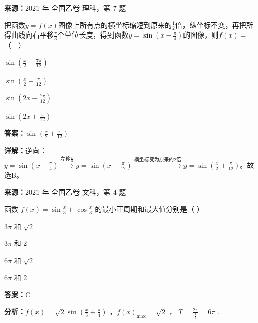 \begin{question}[points=5]
\textbf{来源：}2021 年 全国乙卷-理科，第 7 题\par
把函数$y=f(x)$图像上所有点的横坐标缩短到原来的$\frac12$倍，纵坐标不变，再把所得曲线向右平移$\frac{\pi}{3}$个单位长度，得到函数$y=\sin\left(x-\frac{\pi}{4}\right)$的图像，则$f(x)=$（  ）
\begin{choices}
  \item $\sin\left(\frac{x}{2}-\frac{7\pi}{12}\right)$
  \item $\sin\left(\frac{x}{2}+\frac{\pi}{12}\right)$
  \item $\sin\left(2x-\frac{7\pi}{12}\right)$
  \item $\sin\left(2x+\frac{\pi}{12}\right)$
\end{choices}
\begin{solution}
\textbf{答案：}$\sin\left(\frac{x}{2}+\frac{\pi}{12}\right)$

\textbf{详解：}逆向：$y=\sin\left(x-\frac{\pi}{4}\right) \xrightarrow{\text{左移}\frac{\pi}{3}} y=\sin\left(x+\frac{\pi}{12}\right) \xrightarrow{\text{横坐标变为原来的2倍}} y=\sin\left(\frac{x}{2}+\frac{\pi}{12}\right)$。故选B。
\end{solution}
\end{question}

\begin{question}[points=5]
\textbf{来源：}2021 年 全国乙卷-文科，第 4 题\par
函数 $f(x) = \sin\frac{x}{3} + \cos\frac{x}{3}$ 的最小正周期和最大值分别是（ ）
\begin{choices}
  \item $3\pi$ 和 $\sqrt{2}$
  \item $3\pi$ 和 $2$
  \item $6\pi$ 和 $\sqrt{2}$
  \item $6\pi$ 和 $2$
\end{choices}
\begin{solution}
\textbf{答案：}C

\textbf{分析：}$f(x) = \sqrt{2}\sin\left(\frac{x}{3} + \frac{\pi}{4}\right)$ ，$f(x)_{\max} = \sqrt{2}$ ， $T = \frac{2\pi}{\frac{1}{3}} = 6\pi$ .
\end{solution}
\end{question}

